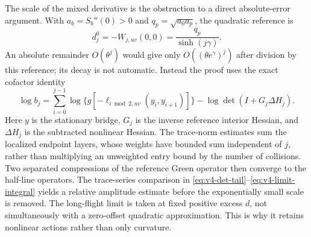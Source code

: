 The scale of the mixed derivative is the obstruction to a direct
absolute-error argument.  With $a_b=S_b''(0)>0$ and
$q_p=\sqrt{a_0a_p}$, the quadratic reference is
\begin{equation}\label{eq:v50-reference-scale}
 d_j^0=-W_{j,uv}(0,0)=\frac{q_p}{\sinh(j\gamma)}.
\end{equation}
An absolute remainder $O(\theta^j)$ would give only
$O((\theta e^\gamma)^j)$ after division by this reference; its
decay is not automatic.  Instead the proof uses the exact cofactor
identity
\begin{equation}\label{eq:v50-relative-log}
 \log b_j=\sum_{i=0}^{j-1}
 \log\{g[-\ell_{i\bmod2,uv}(y_i,y_{i+1})]\}
                   -\log\det(I+G_j\Delta H_j).
\end{equation}
Here $y$ is the stationary bridge, $G_j$ is the inverse reference
interior Hessian, and $\Delta H_j$ is the subtracted nonlinear
Hessian.  The trace-norm estimates sum the localized endpoint layers,
whose weights have bounded sum independent of $j$, rather than
multiplying an unweighted entry bound by the number of collisions.
Two separated compressions of the reference Green operator then
converge to the half-line operators.  The trace-series comparison in
\eqref{eq:v4-det-tail}--\eqref{eq:v4-limit-integral} yields a
relative amplitude estimate before the exponentially small scale is
removed.  The long-flight limit is taken at fixed positive excess
$d$, not simultaneously with a zero-offset quadratic approximation.
This is why it retains nonlinear actions rather than only curvature.

